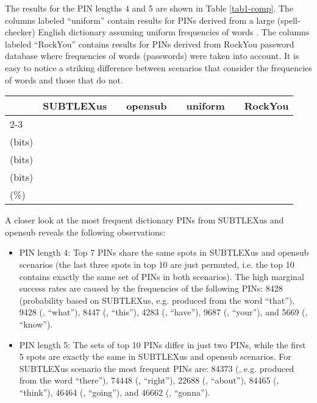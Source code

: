 \documentclass[a4paper, 11pt]{article}
\newcommand{\ra}[1]{\renewcommand{\arraystretch}{#1}}
\begin{document}
{The results for the PIN lengths 4 and 5 are shown in Table \ref{tab1-comp}. The columns labeled ``uniform''
contain results for PINs derived from a large (spell-checker) English dictionary assuming uniform frequencies 
of words \cite{SS13}. The columns labeled ``RockYou'' contains results for PINs derived from RockYou password 
database where frequencies of words (passwords) were taken into account. It is easy to notice a striking 
difference between scenarios that consider the frequencies of words and those that do not. 

\begin{table*}[h]\centering
\ra{1.2}
\begin{tabular}{@{}lrrrrrrrrrrr@{}}\toprule
 & \multicolumn{2}{c}{SUBTLEXus} &\phantom{a} & \multicolumn{2}{c}{opensub} &\phantom{a}& \multicolumn{2}{c}{uniform \cite{SS13}}
   &\phantom{a}& \multicolumn{2}{c}{RockYou \cite{SS13}}\\
   \cmidrule{2-3} \cmidrule{5-6} \cmidrule{8-9} \cmidrule{11-12}
 &  &  &&  &  &&  &   &&  &  \\ 
\midrule
 (bits) 
  &  &  &&  &  &&  &  &&  &  \\
  (bits) 
  &  &  &&  &  &&  &  &&  &  \\
 (bits) 
  &  &  &&  &  &&  &  &&  &  \\
 (\%) 
  &  &  &&  &  &&  &  &&  &  \\
\bottomrule
\end{tabular}
\caption{Comparison of metrics for straightforward construction of dictionary PINs}\label{tab1-comp}
\end{table*}

A closer look at the most frequent dictionary PINs from SUBTLEXus and opensub reveals the following observations:

\begin{itemize}
\renewcommand{\labelitemi}{}
\item PIN length 4: Top 7 PINs share the same spots in SUBTLEXus and opensub scenarios (the last three spots in 
top 10 are just permuted, i.e. the top 10 contains exactly the same set of PINs in both scenarios). The high marginal 
success rates are caused by the frequencies of the following PINs: 8428 (probability  based on SUBTLEXus, e.g.
produced from the word ``that''), 9428 (, ``what''), 8447 (, ``this''), 4283 (, ``have''), 
9687 (, ``your''), and 5669 (, ``know'').
\item PIN length 5: The sets of top 10 PINs differ in just two PINs, while the first 5 spots are exactly the same
in SUBTLEXus and opensub scenarios. For SUBTLEXus scenario the most frequent PINs are: 84373 (, e.g. produced 
from the word ``there''), 74448 (, ``right''), 22688 (, ``about''), 84465 (, ``think''),
46464 (, ``going''), and 46662 (, ``gonna'').
\end{itemize}

}
\end{document}
